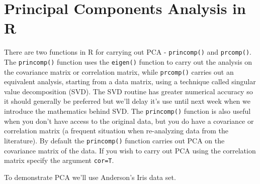 
\section{Principal Components Analysis in R}

There are two functions in R for carrying out PCA -
\lstinline!princomp()! and \lstinline!prcomp()!. The
\lstinline!princomp()! function uses the \lstinline!eigen()! function to
carry out the analysis on the covariance matrix or correlation matrix,
while \lstinline!prcomp()! carries out an equivalent analysis, starting
from a data matrix, using a technique called singular value
decomposition (SVD). The SVD routine has greater numerical accuracy so
it should generally be preferred but we'll delay it's use until next
week when we introduce the mathematics behind SVD. The
\lstinline!princomp()! function is also useful when you don't have
access to the original data, but you do have a covariance or correlation
matrix (a frequent situation when re-analyzing data from the
literature). By default the \lstinline!princomp()! function carries out
PCA on the covariance matrix of the data. If you wish to carry out PCA
using the correlation matrix specify the argument \lstinline!cor=T!.

To demonstrate PCA we'll use Anderson's Iris data set.

